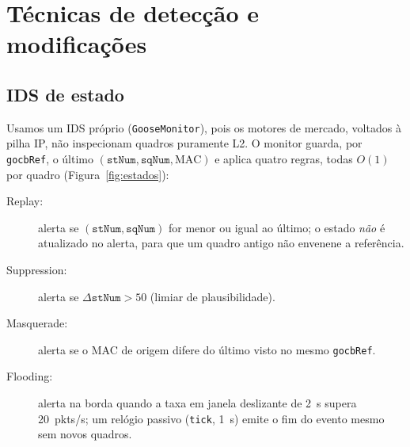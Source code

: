 \documentclass[12pt]{article}
\begin{document}
\section{T\'ecnicas de detec\c{c}\~ao e modifica\c{c}\~oes}\label{sec:tecnicas}

\subsection{IDS de estado}

Usamos um IDS pr\'oprio (\texttt{GooseMonitor}), pois os motores de mercado, voltados \`a pilha IP, n\~ao inspecionam quadros puramente L2. O monitor guarda, por \texttt{gocbRef}, o \'ultimo $(\texttt{stNum},\texttt{sqNum},\mathrm{MAC})$ e aplica quatro regras, todas $O(1)$ por quadro (Figura~\ref{fig:estados}):
\begin{description}
  \item[Replay:] alerta se $(\texttt{stNum},\texttt{sqNum})$ for menor ou igual ao \'ultimo; o estado \emph{n\~ao} \'e atualizado no alerta, para que um quadro antigo n\~ao envenene a refer\^encia.
  \item[Suppression:] alerta se $\Delta\texttt{stNum} > 50$ (limiar de plausibilidade).
  \item[Masquerade:] alerta se o MAC de origem difere do \'ultimo visto no mesmo \texttt{gocbRef}.
  \item[Flooding:] alerta na borda quando a taxa em janela deslizante de 2~s supera 20~pkts/s; um rel\'ogio passivo (\texttt{tick}, 1~s) emite o fim do evento mesmo sem novos quadros.
\end{description}
\end{document}
